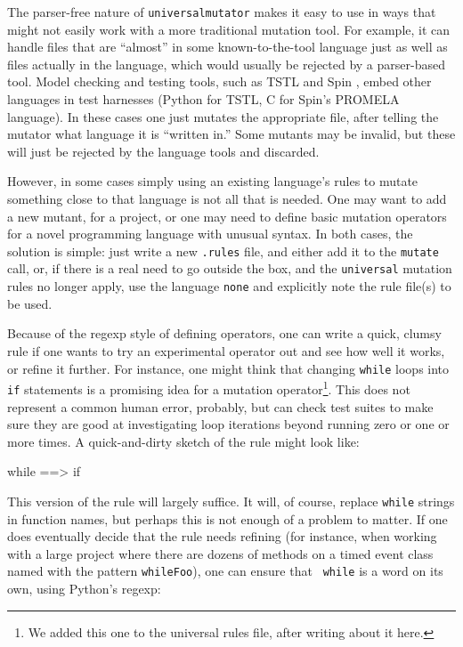 The parser-free nature of {\tt universalmutator} makes it easy to
use in ways that might not easily
work with a more traditional mutation tool.  For example, it can
handle files that are ``almost'' in some known-to-the-tool language
just as well as files actually in the language, which would usually be
rejected by a parser-based tool.  Model checking and
testing tools, such as TSTL  and Spin \cite{SPIN}, embed other
languages in test harnesses (Python for TSTL, C for Spin's PROMELA
language).  In these cases one just mutates the appropriate file, after
telling the mutator what language it is ``written in.''  Some mutants
may be invalid, but these will just be rejected by the language tools
and discarded.

However, in some cases simply using an existing language's rules to
mutate something close to that language is not
all that is needed.  One may want to add a new mutant, for a project,
or one may need to define basic mutation operators for a novel
programming language with unusual syntax.  In both cases, the solution
is simple:  just write a new {\tt .rules} file, and either add it to
the {\tt mutate} call, or, if there is a real need to go outside the box,
and the {\tt universal} mutation rules no longer apply, use the
language {\tt none} and explicitly note the rule file(s) to be used.

Because of the regexp style of defining operators, one can write a
quick, clumsy rule if one wants to try an experimental operator out and
see how well it works, or refine it further.  For instance, one might
think that changing {\tt while} loops into {\tt if} statements is a
promising idea for a mutation operator\footnote{We added this one to
  the universal rules file, after writing about it here.}.  This does not represent a common human error,
probably, but can check test suites to make sure they are good at
investigating loop iterations beyond running zero or one or more
times.  A quick-and-dirty sketch of the rule might look like:

\begin{code}
while ==> if 
\end{code}

This version of the rule will largely suffice.  It will, of
course, replace {\tt while} strings in function names, but perhaps
this is not enough of a problem to matter.  If one does eventually
decide that the rule needs refining (for instance, when working with a
large project where there are dozens of methods on a timed event class
named with the pattern {\tt whileFoo}), one can ensure that {\tt
  while} is a word on its own, using Python's regexp:

